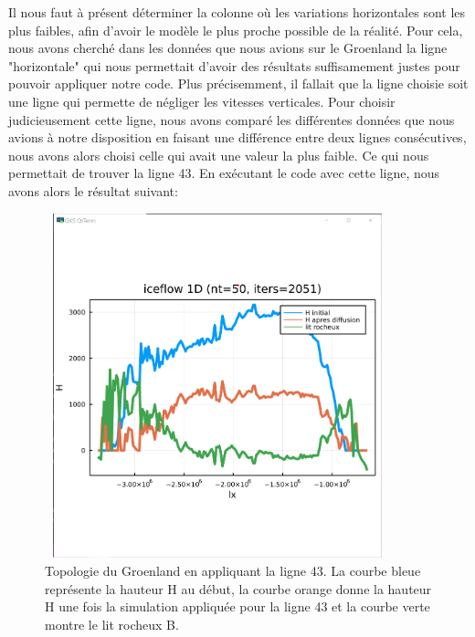 \documentclass{article}
\begin{document}
\newpage
Il nous faut à présent déterminer la colonne où les variations horizontales sont les plus faibles, afin d'avoir le modèle le plus proche possible de la réalité.
\newline
Pour cela, nous avons cherché dans les données que nous avions sur le Groenland la ligne "horizontale" qui nous permettait d'avoir des résultats suffisamement justes pour pouvoir appliquer notre code. Plus précisemment, il fallait que la ligne choisie soit une ligne qui permette de négliger les vitesses verticales.
Pour choisir judicieusement cette ligne, nous avons comparé les différentes données que nous avions à notre disposition en faisant une différence entre deux lignes consécutives, nous avons alors choisi celle qui avait une valeur la plus faible. Ce qui nous permettait de trouver la ligne 43. 
\newline
En exécutant le code avec cette ligne, nous avons alors le résultat suivant: 
\begin{figure}[!htpb]
\centering
\includegraphics[width=10cm, keepaspectratio=true, height=10cm]{ligne43.png}
\caption{Topologie du Groenland en appliquant la ligne 43. La courbe bleue  représente la hauteur H au début, la courbe orange donne la hauteur H une fois la simulation appliquée pour la ligne 43 et la courbe verte montre le lit rocheux B. }
\end{figure}



\end{document}
